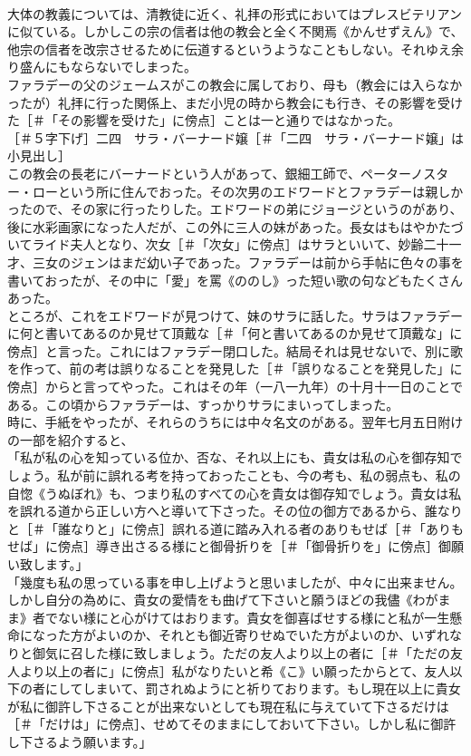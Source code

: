 \documentclass[8pt]{extreport}
\begin{document}
\begin{CJK}{UTF8}{min}
\\	大体の教義については、清教徒に近く、礼拝の形式においてはプレスビテリアンに似ている。しかしこの宗の信者は他の教会と全く不関焉《かんせずえん》で、他宗の信者を改宗させるために伝道するというようなこともしない。それゆえ余り盛んにもならないでしまった。
\\	ファラデーの父のジェームスがこの教会に属しており、母も（教会には入らなかったが）礼拝に行った関係上、まだ小児の時から教会にも行き、その影響を受けた［＃「その影響を受けた」に傍点］ことは一と通りではなかった。
\\	［＃５字下げ］二四　サラ・バーナード嬢［＃「二四　サラ・バーナード嬢」は小見出し］
\\	この教会の長老にバーナードという人があって、銀細工師で、ペーターノスター・ローという所に住んでおった。その次男のエドワードとファラデーは親しかったので、その家に行ったりした。エドワードの弟にジョージというのがあり、後に水彩画家になった人だが、この外に三人の妹があった。長女はもはやかたづいてライド夫人となり、次女［＃「次女」に傍点］はサラといいて、妙齢二十一才、三女のジェンはまだ幼い子であった。ファラデーは前から手帖に色々の事を書いておったが、その中に「愛」を罵《ののし》った短い歌の句などもたくさんあった。
\\	ところが、これをエドワードが見つけて、妹のサラに話した。サラはファラデーに何と書いてあるのか見せて頂戴な［＃「何と書いてあるのか見せて頂戴な」に傍点］と言った。これにはファラデー閉口した。結局それは見せないで、別に歌を作って、前の考は誤りなることを発見した［＃「誤りなることを発見した」に傍点］からと言ってやった。これはその年（一八一九年）の十月十一日のことである。この頃からファラデーは、すっかりサラにまいってしまった。
\\	時に、手紙をやったが、それらのうちには中々名文のがある。翌年七月五日附けの一部を紹介すると、
\\	「私が私の心を知っている位か、否な、それ以上にも、貴女は私の心を御存知でしょう。私が前に誤れる考を持っておったことも、今の考も、私の弱点も、私の自惚《うぬぼれ》も、つまり私のすべての心を貴女は御存知でしょう。貴女は私を誤れる道から正しい方へと導いて下さった。その位の御方であるから、誰なりと［＃「誰なりと」に傍点］誤れる道に踏み入れる者のありもせば［＃「ありもせば」に傍点］導き出さるる様にと御骨折りを［＃「御骨折りを」に傍点］御願い致します。」
\\	「幾度も私の思っている事を申し上げようと思いましたが、中々に出来ません。しかし自分の為めに、貴女の愛情をも曲げて下さいと願うほどの我儘《わがまま》者でない様にと心がけてはおります。貴女を御喜ばせする様にと私が一生懸命になった方がよいのか、それとも御近寄りせぬでいた方がよいのか、いずれなりと御気に召した様に致しましょう。ただの友人より以上の者に［＃「ただの友人より以上の者に」に傍点］私がなりたいと希《こ》い願ったからとて、友人以下の者にしてしまいて、罰されぬようにと祈りております。もし現在以上に貴女が私に御許し下さることが出来ないとしても現在私に与えていて下さるだけは［＃「だけは」に傍点］、せめてそのままにしておいて下さい。しかし私に御許し下さるよう願います。」

\end{CJK}
\end{document}
